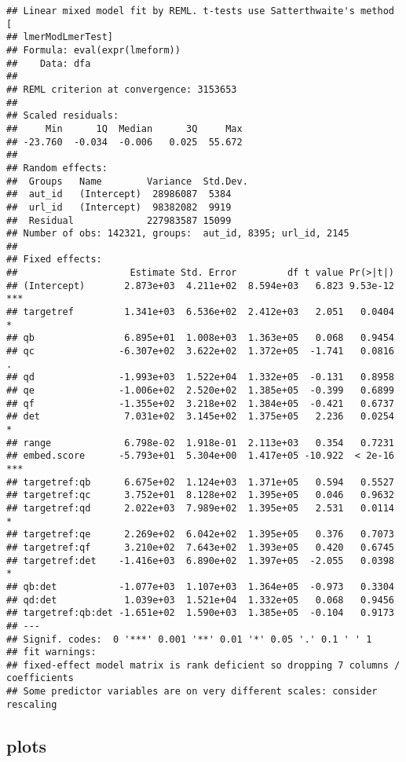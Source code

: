\documentclass[
  12pt,
  oneside]{book}
\begin{document}
\begin{verbatim}
## Linear mixed model fit by REML. t-tests use Satterthwaite's method [
## lmerModLmerTest]
## Formula: eval(expr(lmeform))
##    Data: dfa
## 
## REML criterion at convergence: 3153653
## 
## Scaled residuals: 
##     Min      1Q  Median      3Q     Max 
## -23.760  -0.034  -0.006   0.025  55.672 
## 
## Random effects:
##  Groups   Name        Variance  Std.Dev.
##  aut_id   (Intercept)  28986087  5384   
##  url_id   (Intercept)  98382082  9919   
##  Residual             227983587 15099   
## Number of obs: 142321, groups:  aut_id, 8395; url_id, 2145
## 
## Fixed effects:
##                    Estimate Std. Error         df t value Pr(>|t|)    
## (Intercept)       2.873e+03  4.211e+02  8.594e+03   6.823 9.53e-12 ***
## targetref         1.341e+03  6.536e+02  2.412e+03   2.051   0.0404 *  
## qb                6.895e+01  1.008e+03  1.363e+05   0.068   0.9454    
## qc               -6.307e+02  3.622e+02  1.372e+05  -1.741   0.0816 .  
## qd               -1.993e+03  1.522e+04  1.332e+05  -0.131   0.8958    
## qe               -1.006e+02  2.520e+02  1.385e+05  -0.399   0.6899    
## qf               -1.355e+02  3.218e+02  1.384e+05  -0.421   0.6737    
## det               7.031e+02  3.145e+02  1.375e+05   2.236   0.0254 *  
## range             6.798e-02  1.918e-01  2.113e+03   0.354   0.7231    
## embed.score      -5.793e+01  5.304e+00  1.417e+05 -10.922  < 2e-16 ***
## targetref:qb      6.675e+02  1.124e+03  1.371e+05   0.594   0.5527    
## targetref:qc      3.752e+01  8.128e+02  1.395e+05   0.046   0.9632    
## targetref:qd      2.022e+03  7.989e+02  1.395e+05   2.531   0.0114 *  
## targetref:qe      2.269e+02  6.042e+02  1.395e+05   0.376   0.7073    
## targetref:qf      3.210e+02  7.643e+02  1.393e+05   0.420   0.6745    
## targetref:det    -1.416e+03  6.890e+02  1.397e+05  -2.055   0.0398 *  
## qb:det           -1.077e+03  1.107e+03  1.364e+05  -0.973   0.3304    
## qd:det            1.039e+03  1.521e+04  1.332e+05   0.068   0.9456    
## targetref:qb:det -1.651e+02  1.590e+03  1.385e+05  -0.104   0.9173    
## ---
## Signif. codes:  0 '***' 0.001 '**' 0.01 '*' 0.05 '.' 0.1 ' ' 1
## fit warnings:
## fixed-effect model matrix is rank deficient so dropping 7 columns / coefficients
## Some predictor variables are on very different scales: consider rescaling
\end{verbatim}

\subsection{plots}\label{plots-1}
\end{document}
